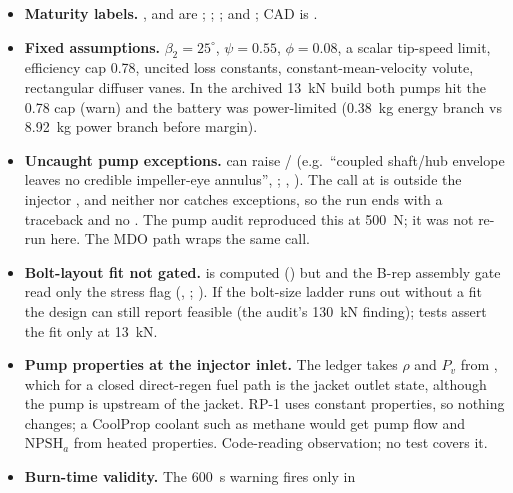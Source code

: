 \begin{itemize}
\item \textbf{Maturity labels.} ,
 and  are
; 
; 
; 
and  ; CAD is
.
\item \textbf{Fixed assumptions.} $\beta_2=25^\circ$, $\psi=0.55$, $\phi=0.08$, a
scalar tip-speed limit, efficiency cap 0.78, uncited loss constants,
constant-mean-velocity volute, rectangular diffuser vanes. In the archived 13~kN
build both pumps hit the 0.78 cap (warn) and the battery was power-limited
(0.38~kg energy branch vs 8.92~kg power branch before margin).
\item \textbf{Uncaught pump exceptions.}  can raise
/ (e.g.\ ``coupled shaft/hub envelope leaves no
credible impeller-eye annulus'', ; , ).
The call at  is outside the injector , and
neither  nor  catches exceptions, so the run
ends with a traceback and no . The pump audit reproduced this at
500~N; it was not re-run here. The MDO path wraps the same call.
\item \textbf{Bolt-layout fit not gated.}  is
computed () but  and the
B-rep assembly gate read only the stress flag 
(, ; ). If the bolt-size ladder
runs out without a fit the design can still report feasible (the audit's 130~kN
finding); tests assert the fit only at 13~kN.
\item \textbf{Pump properties at the injector inlet.} The ledger takes $\rho$ and
$P_v$ from , which for a closed direct-regen fuel path is
the jacket outlet state, although the pump is upstream of the jacket. RP-1 uses
constant properties, so nothing changes; a CoolProp coolant such as methane would
get pump flow and $\mathrm{NPSH}_a$ from heated properties. Code-reading
observation; no test covers it.
\item \textbf{Burn-time validity.} The 600~s warning fires only in

\end{itemize}
